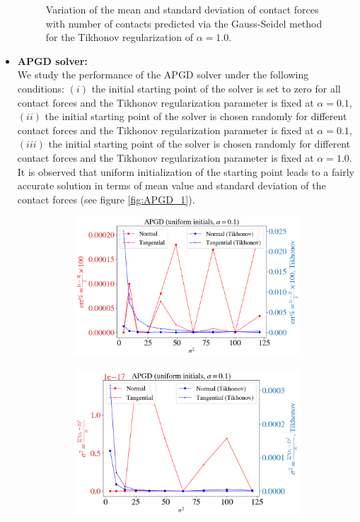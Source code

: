 \begin{itemize}
\begin{figure}[H]
\begin{subfigure}{0.48\columnwidth}
		\end{subfigure}\label{fig:GS_reg}
		\caption{Variation of the mean and standard deviation of contact forces with number of contacts predicted via the Gauss-Seidel method for the Tikhonov regularization of $\alpha=1.0$. }
	\end{figure}
	\item 	\textbf{APGD solver:}\\
	We study the performance of the APGD solver under the following conditions: $(i)$ the initial starting point of the solver is set to zero for all contact forces and the Tikhonov regularization parameter is fixed at $\alpha=0.1$, $(ii)$ the initial starting point of the solver is chosen randomly for different contact forces and the Tikhonov regularization parameter is fixed at $\alpha=0.1$, $(iii)$ the initial starting point of the solver is chosen randomly for different contact forces and the Tikhonov regularization parameter is fixed at $\alpha=1.0$. It is observed that uniform initialization of the starting point leads to a fairly accurate solution in terms of mean value and standard deviation of the contact forces (see figure \ref{fig:APGD_1}). 
	\begin{figure}[H]
		\centering	
		\begin{subfigure}{0.48\columnwidth}	
			\centering
			\includegraphics[width=1.0\textwidth]{images/CD/APGD_u_01_mean.png}
		\end{subfigure}
		\begin{subfigure}{0.48\columnwidth}	
			\centering
			\includegraphics[width=1.0\textwidth]{images/CD/APGD_u_01_std.png}

\end{subfigure}
\end{figure}
\end{itemize}

